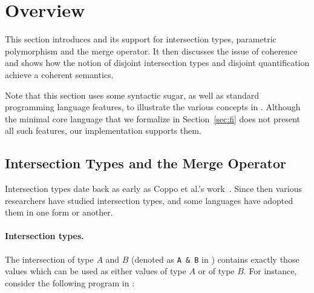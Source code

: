 \section{Overview} \label{sec:overview}

This section introduces \namedis and its support for intersection types,
parametric polymorphism and the merge operator. It then discusses
the issue of coherence and shows how the notion of disjoint
intersection types and disjoint quantification achieve a coherent semantics.

Note that this section uses some syntactic sugar, as well as standard
programming language features, to illustrate the various concepts in
\namedis. Although the minimal core language that we formalize in
Section~\ref{sec:fi} does not present all such features, our implementation
supports them.


\begin{comment}
It then shows that,
with unrestricted intersection types, the system
lacks \emph{coherence}. This motivates the introduction of
disjoint intersection types and extending universal quantification to
disjoint quantification, which is enough to ensure coherence.
\end{comment}

\subsection{Intersection Types and the Merge Operator}

Intersection types date back as early as Coppo et
al.'s work~\cite{coppo1981functional}. Since then various researchers have
studied intersection types, and some languages have adopted them in one
form or another.

\paragraph{Intersection types.}
The intersection of type $A$ and $B$ (denoted as \lstinline{A & B} in
\namedis) contains exactly those values
which can be used as either values of type $A$ or of type $B$. For instance,
consider the following program in \namedis:

